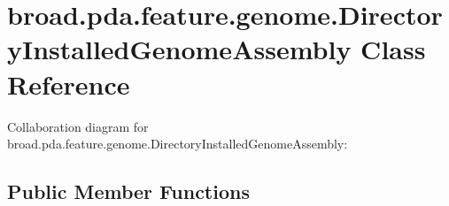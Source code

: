 \hypertarget{classbroad_1_1pda_1_1feature_1_1genome_1_1_directory_installed_genome_assembly}{\section{broad.\+pda.\+feature.\+genome.\+Directory\+Installed\+Genome\+Assembly Class Reference}
\label{classbroad_1_1pda_1_1feature_1_1genome_1_1_directory_installed_genome_assembly}
}


Collaboration diagram for broad.\+pda.\+feature.\+genome.\+Directory\+Installed\+Genome\+Assembly\+:
\subsection*{Public Member Functions}
